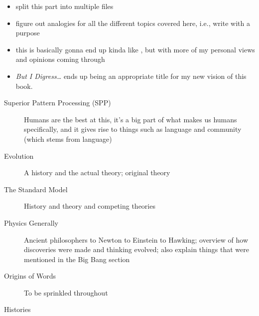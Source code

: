 \documentclass[./butidigress.tex]{subfiles}
\begin{document}
\begingroup\color{MidnightBlue}
\begin{itemize}
    \item split this part into multiple files
    \item figure out analogies for all the different topics covered here, i.e., write with a purpose
    \item this is basically gonna end up kinda like , but with more of my personal views and opinions coming through
    \item \emph{But I Digress\dots} ends up being an appropriate title for my new vision of this book.
\end{itemize}

\unnumsubsection{\textcolor{black}{Topics to Cover}}
\color{MidnightBlue}
\begin{description}
    \item[Superior Pattern Processing (SPP)] Humans are the best at this, it's a big part of what makes us humans specifically, and it gives rise to things such as language and community (which stems from language)
    \item[Evolution] A history and the actual theory; original theory
    \item[The Standard Model] History and theory and competing theories
    \item[Physics Generally] Ancient philosophers to Newton to Einstein to Hawking; overview of how discoveries were made and thinking evolved; also explain things that were mentioned in the Big Bang section
    \item[Origins of Words] To be sprinkled throughout
    \item[Histories]
\end{description}

\endgroup

\newpage
\end{document}
